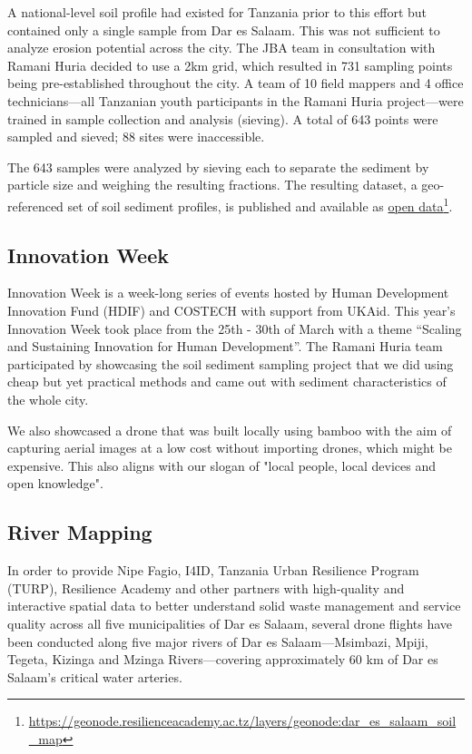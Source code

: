 \documentclass[a4paper,12pt,twoside]{article}
\begin{document}
\begin{multicols}{2}
A national-level soil profile had existed for Tanzania prior to this effort but contained only a single sample from Dar es Salaam. This was not sufficient to analyze erosion potential across the city. The JBA team in consultation with Ramani Huria decided to use a 2km grid, which resulted in 731 sampling points being pre-established throughout the city. A team of 10 field mappers and 4 office technicians—all Tanzanian youth participants in the Ramani Huria project—were trained in sample collection and analysis (sieving). A total of 643 points were sampled and sieved; 88 sites were inaccessible.


The 643 samples were analyzed by sieving each to separate the sediment by particle size and weighing the resulting fractions. The resulting dataset, a geo-referenced set of soil sediment profiles, is published and available as \href{https://geonode.resilienceacademy.ac.tz/layers/geonode:dar_es_salaam_soil_map}{open data}\footnote{\url{https://geonode.resilienceacademy.ac.tz/layers/geonode:dar_es_salaam_soil_map}}.

\subsection{Innovation Week}
Innovation Week is a week-long series of events hosted by Human Development Innovation Fund (HDIF) and COSTECH with support from UKAid. This year’s Innovation Week took place from the 25th - 30th of March with a theme “Scaling and Sustaining Innovation for Human Development”. The Ramani Huria team participated by showcasing the soil sediment sampling project that we did using cheap but yet practical methods and came out with sediment characteristics of the whole city.

We also showcased a drone that was built locally using bamboo with the aim of capturing aerial images at a low cost without importing drones, which might be expensive. This also aligns with our slogan of "local people, local devices and open knowledge".

\subsection{River Mapping}
In order to provide Nipe Fagio, I4ID, Tanzania Urban Resilience Program (TURP), Resilience Academy and other partners with high-quality and interactive spatial data to better understand solid waste management and service quality across all five municipalities of Dar es Salaam, several drone flights have been conducted along five major rivers of Dar es Salaam---Msimbazi, Mpiji, Tegeta, Kizinga and Mzinga Rivers---covering approximately 60 km of Dar es Salaam’s critical water arteries. 


\end{multicols}
\end{document}
